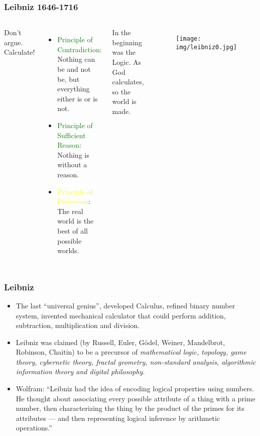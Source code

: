 \documentclass[UTF8,aspectratio=43,11pt,colorlinks,compress,openany]{beamer}%
\begin{document}
\begin{frame}\frametitle{Leibniz 1646-1716}
	\begin{columns}
			\begin{block}{}
				\centerline{\Large Don't argue. Calculate!}
			\end{block}
			\begin{itemize}
				\item \textcolor{green}{{\small Principle of Contradiction}}: Nothing can be and not be, but everything either is or is not.
				\item \textcolor{green}{{\small Principle of Sufficient Reason}}: Nothing is without a reason.
				\item \textcolor{yellow}{{\small Principle of Perfection}}: The real world is the best of all possible worlds.
			\end{itemize}
			\begin{block}{In the beginning was the Logic.}
				As God calculates, so the world is made.
			\end{block}
			\begin{figure}
				\texttt{[image: img/leibniz0.jpg]}
			\end{figure}
	\end{columns}
\end{frame}

\begin{frame}\frametitle{Leibniz}
	\begin{itemize}
		\item The last ``universal genius'', developed Calculus, refined binary number system, invented mechanical calculator that could perform addition, subtraction, multiplication and division.
		\item Leibniz was claimed (by Russell, Euler, G\"odel, Weiner, Mandelbrot, Robinson, Chaitin) to be a precursor of \emph{mathematical logic, topology, game theory, cybernetic theory, fractal geometry, non-standard analysis, algorithmic information theory and digital philosophy}.
		\item Wolfram: ``Leibniz had the idea of encoding logical properties using numbers. He thought about associating every possible attribute of a thing with a prime number, then characterizing the thing by the product of the primes for its attributes --- and then representing logical inference by arithmetic operations.''
	\end{itemize}
\end{frame}
\end{document}
